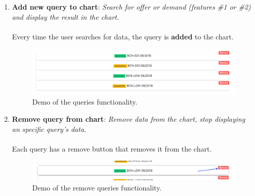 \begin{enumerate}
    \item \textbf{Add new query to chart}: \textit{Search for offer or demand (features \#1 or \#2) and display the result in the chart.}
    \\\\
    Every time the user searches for data, the query is \textbf{added} to the chart.
    \begin{figure}[H]
    \centering
    \includegraphics[scale=0.35]{resources/queries-list.png}
    \caption{Demo of the queries functionality.}
    \end{figure}

    \item \textbf{Remove query from chart}: \textit{Remove data from the chart, stop displaying an specific query's data.}
    \\\\
    Each query has a remove button that removes it from the chart.
    \begin{figure}[H]
    \centering
    \includegraphics[scale=0.35]{resources/queries-remove.png}
    \caption{Demo of the remove queries functionality.}
    \end{figure}

\end{enumerate}


